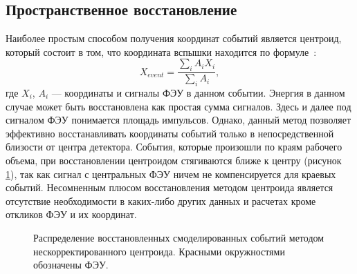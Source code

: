 \subsection{Пространственное восстановление}
\label{subsect3_3_2}
Наиболее простым способом получения координат событий является центроид, который состоит в том, что координата вспышки находится по формуле~\cite{6154607}:
\begin{equation}
    X_{event} = \frac{\sum\limits_{i}A_iX_i}{\sum\limits_{i}A_i},
\end{equation}
где $X_i$, $A_i$ --- координаты и сигналы ФЭУ в данном событии. Энергия в данном случае может быть восстановлена как простая сумма сигналов. Здесь и далее под сигналом ФЭУ понимается площадь импульсов. Однако, данный метод позволяет эффективно восстанавливать координаты событий только в непосредственной близости от центра детектора. События, которые произошли по краям рабочего объема, при восстановлении центроидом стягиваются ближе к центру (рисунок \ref{ris:basecen}), так как сигнал с центральных ФЭУ ничем не компенсируется для краевых событий. Несомненным плюсом восстановления методом центроида является отсутствие необходимости в каких-либо других данных и расчетах кроме откликов ФЭУ и их координат.
\begin{figure}[hbt]
	\caption{Распределение восстановленных смоделированных событий методом нескорректированного центроида. Красными окружностями обозначены ФЭУ.}
	\label{ris:basecen}
\end{figure}
